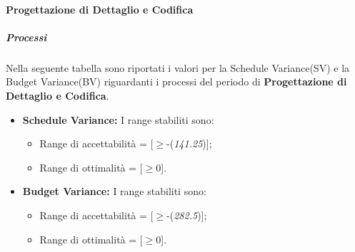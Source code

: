     \paragraph{Progettazione di Dettaglio e Codifica}
      \subparagraph{Processi}
      Nella seguente tabella sono riportati i valori per la Schedule Variance(SV) e la Budget Variance(BV) riguardanti i processi del periodo di \textbf{Progettazione di Dettaglio e Codifica}.\\
      \begin{itemize}
      \item \textbf{Schedule Variance:} I range stabiliti sono:
      \begin{itemize}
        \item Range di accettabilità = [\(\geq\)-(\emph{141.25})];
        \item Range di ottimalità = [\(\geq\)0].
      \end{itemize}
      
      \item \textbf{Budget Variance:} I range stabiliti sono:
      \begin{itemize}
        \item Range di accettabilità = [\(\geq\)-(\emph{282.5})];
        \item Range di ottimalità = [\(\geq\)0].
      \end{itemize}
      
      
      \end{itemize}
     
